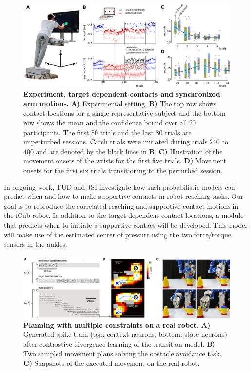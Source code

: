 \begin{figure}%
\centering
\includegraphics[width=\textwidth]{images/Figure-1(rueckert)}
 \caption[Human reaching experiment with target dependent contacts and synchronized arm motions.]{\textbf{Experiment, target dependent contacts and synchronized arm motions.} \textbf{A)} Experimental setting. 
 \textbf{B)}  The top row shows contact locations for a single representative subject 
 and the bottom row shows the mean and the confidence bound over all $20$ participants. 
 The first $80$ trials and the last $80$ trials are unperturbed sessions. 
 Catch trials were initiated during trials $240$ to $400$ and are denoted by the black lines in \textbf{B}.
 \textbf{C)} Illustration of the movement onsets of the wrists for the first five trials. 
 \textbf{D)} Movement onsets for the first six trials transitioning to the perturbed session. 
}
\label{fig:subFigContactLocationsAllSubjects}
\end{figure}

In ongoing work, TUD and JSI investigate how such probabilistic models can predict when 
and how to make supportive contacts in robot reaching tasks. Our goal is to 
reproduce the correlated reaching and supportive contact motions in the iCub robot. 
In addition to the target dependent contact locations, a module that predicts 
when to initiate a supportive contact will be developed. This model will make 
use of the estimated center of pressure using the two force/torque sensors in the 
ankles. 

\begin{figure}
\centering
\includegraphics[width=\textwidth]{images/KukaLearnedModelObstacles}
 \caption[Planning in spkining neural networks with multiple constraints on a Kuka robot.]{\textbf{Planning with multiple constraints on a real robot.} {\bf A)} Generated 
spike train (top: context neurons, bottom: state neurons) after contrastive 
divergence learning of the transition model. {\bf B)} Two sampled movement plans 
solving the obstacle avoidance task. {\bf C)} Snapshots of the executed movement 
on the real robot.
}
\label{fig:exp_kukaRueckert}
\end{figure}

